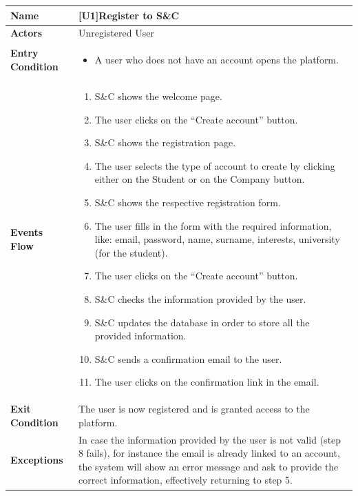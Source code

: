 \begin{center}
    \begin{tabular}{|p{9em}|p{27em}|}
        \hline
        \rowcolor{bluepoli!40}
        \textbf{Name} & \textbf{[U1]Register to S\&C} \\
        \hline
        \textbf{Actors} & Unregistered User \\
        \hline
        \textbf{Entry Condition} & 
            \begin{itemize}
                \item A user who does not have an account opens the platform. 
            \end{itemize} \\
        \hline
        \textbf{Events Flow} & 
        \begin{enumerate}
            \item S\&C shows the welcome page.
            \item The user clicks on the ``Create account'' button. 
            \item S\&C shows the registration page.
            \item The user selects the type of account to create by clicking either on the Student or on the Company button.
            \item S\&C shows the respective registration form.
            \item The user fills in the form with the required information, like: email, password, name, surname, interests, university (for the student).
            \item The user clicks on the ``Create account'' button.
            \item S\&C checks the information provided by the user.
            \item S\&C updates the database in order to store all the provided information.
            \item S\&C sends a confirmation email to the user.
            \item The user clicks on the confirmation link in the email.
        \end{enumerate} \\
        \hline
        \textbf{Exit Condition} & The user is now registered and is granted access to the platform. \\
        \hline
        \textbf{Exceptions} & In case the information provided by the user is not valid (step 8 fails), for instance the email is already linked to 
        an account, the system will show an error message and ask to provide the correct information, effectively returning to step 5. \\
        \hline
    \end{tabular}
\end{center}

